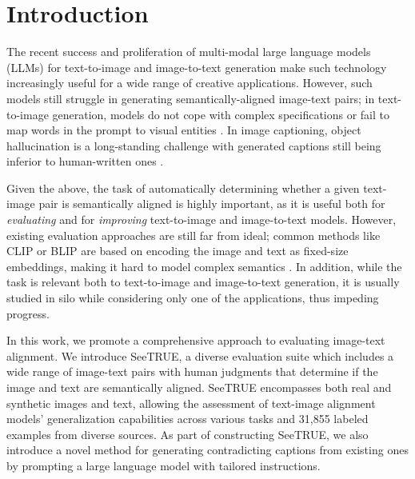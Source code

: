 \documentclass{article}
\newcommand{\datasetname}[0]{SeeTRUE\xspace}
\begin{document}
\section{Introduction}
\label{sec:intro}
The recent success and proliferation of multi-modal large language models (LLMs) for text-to-image and image-to-text generation \citep{ramesh2021zero, ramesh2022hierarchical, rombach2022high, yu2022scaling, saharia2022photorealistic,li2022blip, li2023blip, alayrac2022flamingo} make such technology increasingly useful for a wide range of creative applications. However, such models still struggle in generating semantically-aligned image-text pairs; in text-to-image generation, models do not cope with complex specifications \citep{marcus2022very, liu2021learning} or fail to map words in the prompt to visual entities \citep{rassin2022dalle, chefer2023attend}. In image captioning, object hallucination is a long-standing challenge \citep{rohrbach-etal-2018-object} with generated captions still being inferior to human-written ones \citep{kasai-etal-2022-transparent}. 

Given the above, the task of automatically determining whether a given text-image pair is semantically aligned is highly important, as it is useful both for \textit{evaluating} and for \textit{improving} text-to-image and image-to-text models. However, existing evaluation approaches are still far from ideal; common methods like CLIP \citep{radford2021learning} or BLIP \citep{li2022blip,li2023blip} are based on encoding the image and text as fixed-size embeddings, making it hard to model complex semantics \citep{yuksekgonul2022and}. In addition, while the task is relevant both to text-to-image and image-to-text generation, it is usually studied in silo while considering only one of the applications, thus impeding progress.

In this work, we promote a comprehensive approach to evaluating image-text alignment. We introduce \datasetname, a diverse evaluation suite which includes a wide range of image-text pairs with human judgments that determine if the image and text are semantically aligned. 
\datasetname encompasses both real and synthetic images and text, allowing the assessment of text-image alignment models' generalization capabilities across various tasks and 31,855 labeled examples from diverse sources. As part of constructing \datasetname, we also introduce a novel method for generating contradicting captions from existing ones by prompting a large language model with tailored instructions.
\end{document}
